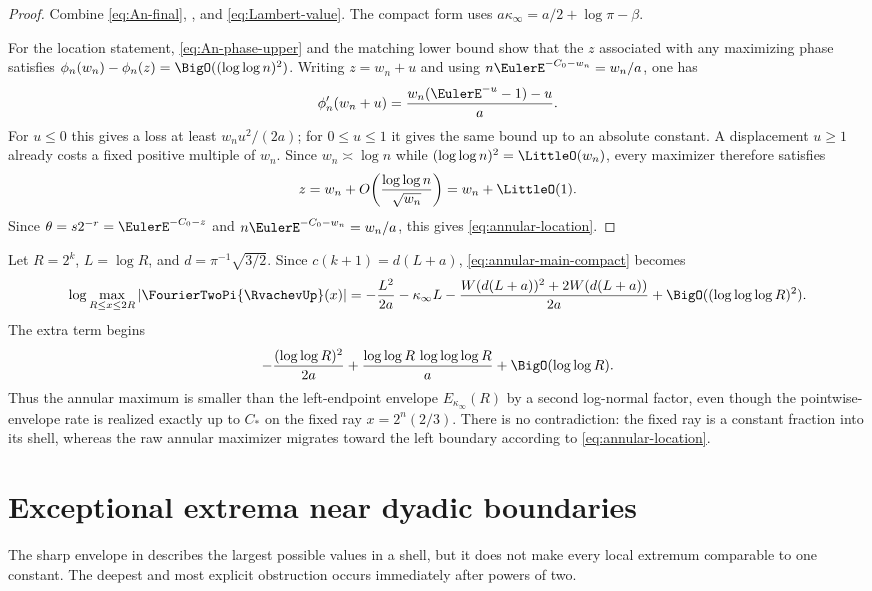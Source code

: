\documentclass[11pt,oneside]{article}
\numberwithin{equation}{section}
\theoremstyle{definition}
\theoremstyle{remark}
\begin{document}
\begin{proof}
Combine \eqref{eq:An-final}, , and
\eqref{eq:Lambert-value}.  The compact form uses
$a\kappa_\infty=a/2+\log\pi-\beta$.

For the location statement, \eqref{eq:An-phase-upper} and the matching lower bound show
that the $z$ associated with any maximizing phase satisfies
$\phi_n(w_n)-\phi_n(z)=\BigO((\log\log n)^2)$.  Writing $z=w_n+u$ and using
$n\EulerE^{-C_0-w_n}=w_n/a$, one has
\[
 \phi_n'(w_n+u)=\frac{w_n(\EulerE^{-u}-1)-u}{a}.
\]
For $u\le0$ this gives a loss at least $w_nu^2/(2a)$; for $0\le u\le1$ it gives the same
bound up to an absolute constant.  A displacement $u\ge1$ already costs a fixed positive
multiple of $w_n$.  Since $w_n\asymp\log n$ while $(\log\log n)^2=\LittleO(w_n)$, every maximizer
therefore satisfies
\[
 z=w_n+O\!\left(\frac{\log\log n}{\sqrt{w_n}}\right)=w_n+\LittleO(1).
\]
Since
$\theta=s2^{-r}=\EulerE^{-C_0-z}$ and
$n\EulerE^{-C_0-w_n}=w_n/a$, this gives \eqref{eq:annular-location}.
\end{proof}

Let $R=2^k$, $L=\log R$, and $d=\pi^{-1}\sqrt{3/2}$.  Since
$c(k+1)=d(L+a)$, \eqref{eq:annular-main-compact} becomes
\begin{equation}
 \log\max_{R\le x\le2R}|\FourierTwoPi{\RvachevUp}(x)|
 =-\frac{L^2}{2a}-\kappa_\infty L
 -\frac{W(d(L+a))^2+2W(d(L+a))}{2a}
 +\BigO((\log\log\log R)^2).
 \label{eq:annular-physical}
\end{equation}
The extra term begins
\begin{equation}
 -\frac{(\log\log R)^2}{2a}
 +\frac{\log\log R\,\log\log\log R}{a}
 +\BigO(\log\log R).
 \label{eq:second-lognormal}
\end{equation}
Thus the annular maximum is smaller than the left-endpoint envelope
$E_{\kappa_\infty}(R)$ by a second log-normal factor, even though the pointwise-envelope
rate is realized exactly up to $C_*$ on the fixed ray $x=2^n(2/3)$.  There is no
contradiction: the
fixed ray is a constant fraction into its shell, whereas the raw annular maximizer migrates
toward the left boundary according to \eqref{eq:annular-location}.

\section{Exceptional extrema near dyadic boundaries}
\label{sec:exceptional-extrema}

The sharp envelope in  describes the largest possible values in
a shell, but it does not make every local extremum comparable to one constant.  The deepest
and most explicit obstruction occurs immediately after powers of two.
\end{document}
